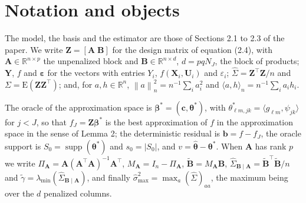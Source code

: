 \documentclass[10pt]{book}
\theoremstyle{definition}
\newcommand{\R}{\mathbb{R}}
\newcommand{\E}{\mathrm{E}}
\newcommand{\T}{^{\top}}
\newcommand{\normn}[1]{\left\lVert #1 \right\rVert_{n}}
\newcommand{\inner}[2]{\langle #1, #2 \rangle}
\newcommand{\cv}{\ell}
\newcommand{\md}{m}
\newcommand{\lev}{j}
\newcommand{\tsl}{k}
\newcommand{\NJ}{N_{J}}
\newcommand{\bX}{\mathbf{X}}
\newcommand{\bU}{\mathbf{U}}
\newcommand{\bZ}{\mathbf{Z}}
\newcommand{\gcomp}[2]{g_{#1#2}}
\newcommand{\wav}[2]{\psi_{#1#2}}
\newcommand{\coefs}[4]{\theta^{*}_{#1#2,#3#4}}
\newcommand{\btheta}{\boldsymbol{\theta}}
\newcommand{\thetastar}{\btheta^{*}}
\newcommand{\thetahat}{\widehat{\btheta}}
\newcommand{\bbeta}{\boldsymbol{\beta}}
\newcommand{\betastar}{\bbeta^{*}}
\newcommand{\bc}{\mathbf{c}}
\newcommand{\Gram}{\Sigma}
\newcommand{\Gramhat}{\widehat{\Sigma}}
\newcommand{\Szero}{S_{0}}
\newcommand{\Amat}{\mathbf{A}}
\newcommand{\Bmat}{\mathbf{B}}
\newcommand{\Btil}{\widetilde{\Bmat}}
\newcommand{\PA}{\Pi_{\Amat}}
\newcommand{\MA}{M_{\Amat}}
\newcommand{\bveps}{\boldsymbol{\varepsilon}}
\newcommand{\bb}{\mathbf{b}}
\newcommand{\bY}{\mathbf{Y}}
\newcommand{\smax}{\widehat{\sigma}_{\max}}
\newcommand{\gtil}{\widetilde{\gamma}}
\newcommand{\lmin}{\lambda_{\min}}
\newcommand{\GBA}{\Gramhat_{\Bmat\mid\Amat}}
\DeclareMathOperator{\supp}{supp}
\begin{document}
\section{Notation and objects}

The model, the basis and the estimator are those of Sections 2.1 to 2.3 of the
paper. We write $\bZ = [\Amat\;\Bmat]$ for the design matrix of equation
(2.4), with $\Amat \in \R^{n\times p}$ the unpenalized block and
$\Bmat \in \R^{n\times d}$, $d = pq\NJ$, the block of products; $\bY$, $f$ and
$\bveps$ for the vectors with entries $Y_i$, $f(\bX_i,\bU_i)$ and
$\varepsilon_i$; $\Gramhat = \bZ\T\bZ/n$ and $\Gram = \E(\bZ\bZ\T)$; and, for
$a, h \in \R^n$, $\normn{a}^2 = n^{-1}\sum_i a_i^2$ and
$\inner{a}{h}_n = n^{-1}\sum_i a_ih_i$.

The \textcolor{colR1}{oracle of the approximation space} is $\betastar = (\bc,\thetastar)$, with
$\coefs{\cv}{\md}{\lev}{\tsl} = \inner{\gcomp{\cv}{\md}}{\wav{\lev}{\tsl}}$
for $\lev < J$, so that $f_J = \bZ\betastar$ is the best approximation of $f$
in the \textcolor{colR1}{approximation space} in the sense of Lemma 2; the deterministic residual is
$\bb = f - f_J$, the oracle support is $\Szero = \supp(\thetastar)$ and
$s_0 = |\Szero|$, and $v = \thetahat - \thetastar$. When $\Amat$ has rank $p$
we write $\PA = \Amat(\Amat\T\Amat)^{-1}\Amat\T$, $\MA = I_n - \PA$,
$\Btil = \MA\Bmat$, $\GBA = \Btil\T\Btil/n$ and $\gtil = \lmin(\GBA)$, and
finally $\smax^2 = \max_a(\Gramhat)_{aa}$, the maximum being over the $d$
penalized columns.
\end{document}
